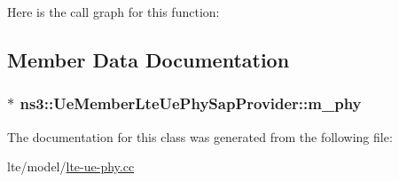 Here is the call graph for this function\+:




\subsection{Member Data Documentation}
\subsubsection[{\texorpdfstring{m\+\_\+phy}{m_phy}}]{$\ast$ ns3\+::\+Ue\+Member\+Lte\+Ue\+Phy\+Sap\+Provider\+::m\+\_\+phy\hspace{0.3cm}{\ttfamily [private]}}\hypertarget{classns3_1_1UeMemberLteUePhySapProvider_a8a80970c0490ee1845f4160615817283}{}\label{classns3_1_1UeMemberLteUePhySapProvider_a8a80970c0490ee1845f4160615817283}


The documentation for this class was generated from the following file\+:\begin{DoxyCompactItemize}
\item 
lte/model/\hyperlink{lte-ue-phy_8cc}{lte-\/ue-\/phy.\+cc}\end{DoxyCompactItemize}
